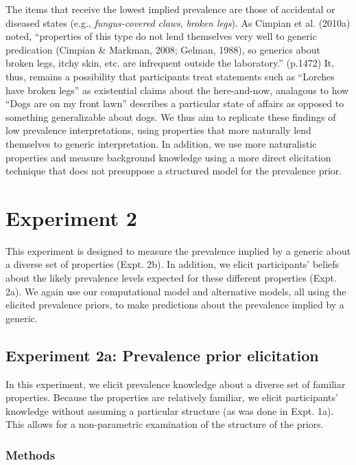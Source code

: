 \documentclass[,man,floatsintext]{apa6}
\theoremstyle{definition}
\theoremstyle{definition}
\theoremstyle{definition}
\theoremstyle{remark}
\begin{document}
The items that receive the lowest implied prevalence are those of
accidental or diseased states (e.g., \emph{fungus-covered claws},
\emph{broken legs}). As Cimpian et al. (2010a) noted,
\enquote{properties of this type do not lend themselves very well to
generic predication (Cimpian \& Markman, 2008; Gelman, 1988), so
generics about broken legs, itchy skin, etc. are infrequent outside the
laboratory.} (p.1472) It, thus, remains a possibility that participants
treat statements such as \enquote{Lorches have broken legs} as
existential claims about the here-and-now, analagous to how
\enquote{Dogs are on my front lawn} describes a particular state of
affairs as opposed to something generalizable about dogs. We thus aim to
replicate these findings of low prevalence interpretations, using
properties that more naturally lend themselves to generic
interpretation. In addition, we use more naturalistic properties and
measure background knowledge using a more direct elicitation technique
that does not presuppose a structured model for the prevalence prior.

\hypertarget{experiment-2}{%
\section{Experiment 2}\label{experiment-2}}

This experiment is designed to measure the prevalence implied by a
generic about a diverse set of properties (Expt. 2b). In addition, we
elicit participants' beliefs about the likely prevalence levels expected
for these different properties (Expt. 2a). We again use our
computational model and alternative models, all using the elicited
prevalence priors, to make predictions about the prevalence implied by a
generic.

\hypertarget{experiment-2a-prevalence-prior-elicitation}{%
\subsection{Experiment 2a: Prevalence prior
elicitation}\label{experiment-2a-prevalence-prior-elicitation}}

In this experiment, we elicit prevalence knowledge about a diverse set
of familiar properties. Because the properties are relatively familiar,
we elicit participants' knowledge without assuming a particular
structure (as was done in Expt. 1a). This allows for a non-parametric
examination of the structure of the priors.

\hypertarget{methods}{%
\subsubsection{Methods}\label{methods}}
\end{document}
